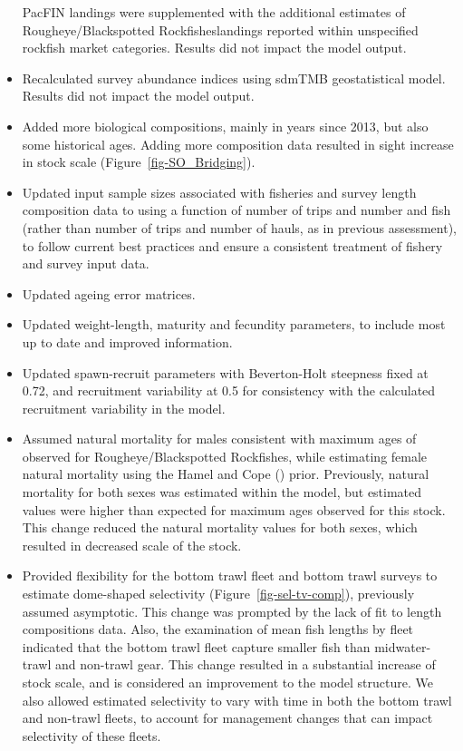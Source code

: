 \documentclass[
]{scrartcl}
\begin{document}
\begin{itemize}
  PacFIN landings were supplemented with the additional estimates of
  Rougheye/Blackspotted Rockfisheslandings reported within unspecified
  rockfish market categories. Results did not impact the model output.
\item
  Recalculated survey abundance indices using sdmTMB geostatistical
  model. Results did not impact the model output.
\item
  Added more biological compositions, mainly in years since 2013, but
  also some historical ages. Adding more composition data resulted in
  sight increase in stock scale (Figure~\ref{fig-SO_Bridging}).
\item
  Updated input sample sizes associated with fisheries and survey length
  composition data to using a function of number of trips and number and
  fish (rather than number of trips and number of hauls, as in previous
  assessment), to follow current best practices and ensure a consistent
  treatment of fishery and survey input data.
\item
  Updated ageing error matrices.
\item
  Updated weight-length, maturity and fecundity parameters, to include
  most up to date and improved information.
\item
  Updated spawn-recruit parameters with Beverton-Holt steepness fixed at
  0.72, and recruitment variability at 0.5 for consistency with the
  calculated recruitment variability in the model.
\item
  Assumed natural mortality for males consistent with maximum ages of
  observed for Rougheye/Blackspotted Rockfishes, while estimating female
  natural mortality using the Hamel and Cope
  () prior. Previously,
  natural mortality for both sexes was estimated within the model, but
  estimated values were higher than expected for maximum ages observed
  for this stock. This change reduced the natural mortality values for
  both sexes, which resulted in decreased scale of the stock.
\item
  Provided flexibility for the bottom trawl fleet and bottom trawl
  surveys to estimate dome-shaped selectivity
  (Figure~\ref{fig-sel-tv-comp}), previously assumed asymptotic. This
  change was prompted by the lack of fit to length compositions data.
  Also, the examination of mean fish lengths by fleet indicated that the
  bottom trawl fleet capture smaller fish than midwater-trawl and
  non-trawl gear. This change resulted in a substantial increase of
  stock scale, and is considered an improvement to the model structure.
  We also allowed estimated selectivity to vary with time in both the
  bottom trawl and non-trawl fleets, to account for management changes
  that can impact selectivity of these fleets.
\end{itemize}
\end{document}
